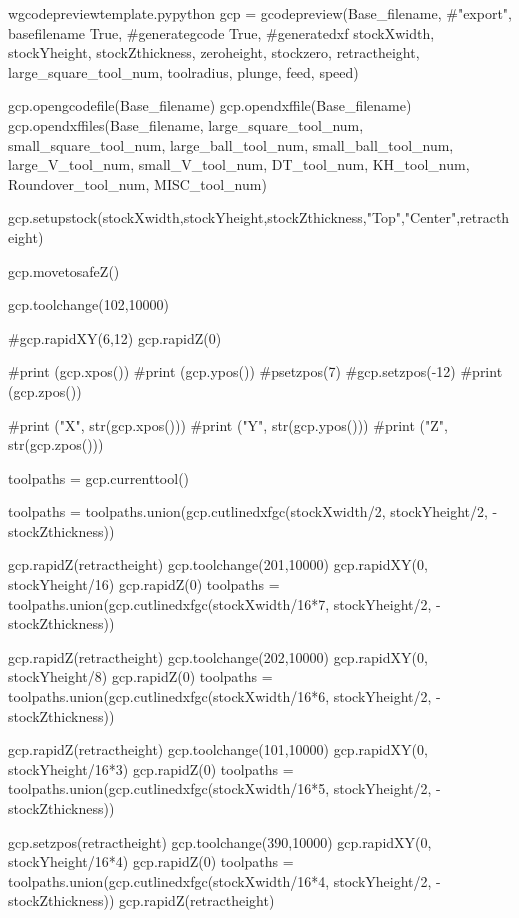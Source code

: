 \documentclass{ltxdoc}
\begin{document}
\begin{writecode}{w}{gcodepreviewtemplate.py}{python}
gcp = gcodepreview(Base_filename, #"export", basefilename
                   True, #generategcode
                   True, #generatedxf
                   stockXwidth,
                   stockYheight,
                   stockZthickness,
                   zeroheight,
                   stockzero,
                   retractheight,
                   large_square_tool_num,
                   toolradius,
                   plunge,
                   feed,
                   speed)

gcp.opengcodefile(Base_filename)
gcp.opendxffile(Base_filename)
gcp.opendxffiles(Base_filename,
                 large_square_tool_num, 
                 small_square_tool_num, 
                 large_ball_tool_num,
                 small_ball_tool_num,
                 large_V_tool_num,
                 small_V_tool_num,
                 DT_tool_num,
                 KH_tool_num,
                 Roundover_tool_num,
                 MISC_tool_num)

gcp.setupstock(stockXwidth,stockYheight,stockZthickness,"Top","Center",retractheight)

gcp.movetosafeZ()

gcp.toolchange(102,10000)

#gcp.rapidXY(6,12)
gcp.rapidZ(0)

#print (gcp.xpos())
#print (gcp.ypos())
#psetzpos(7)
#gcp.setzpos(-12)
#print (gcp.zpos())

#print ("X", str(gcp.xpos()))
#print ("Y", str(gcp.ypos()))
#print ("Z", str(gcp.zpos()))

toolpaths = gcp.currenttool()

toolpaths = toolpaths.union(gcp.cutlinedxfgc(stockXwidth/2, stockYheight/2, -stockZthickness))

gcp.rapidZ(retractheight)
gcp.toolchange(201,10000)
gcp.rapidXY(0, stockYheight/16)
gcp.rapidZ(0)
toolpaths = toolpaths.union(gcp.cutlinedxfgc(stockXwidth/16*7, stockYheight/2, -stockZthickness))

gcp.rapidZ(retractheight)
gcp.toolchange(202,10000)
gcp.rapidXY(0, stockYheight/8)
gcp.rapidZ(0)
toolpaths = toolpaths.union(gcp.cutlinedxfgc(stockXwidth/16*6, stockYheight/2, -stockZthickness))

gcp.rapidZ(retractheight)
gcp.toolchange(101,10000)
gcp.rapidXY(0, stockYheight/16*3)
gcp.rapidZ(0)
toolpaths = toolpaths.union(gcp.cutlinedxfgc(stockXwidth/16*5, stockYheight/2, -stockZthickness))

gcp.setzpos(retractheight)
gcp.toolchange(390,10000)
gcp.rapidXY(0, stockYheight/16*4)
gcp.rapidZ(0)
toolpaths = toolpaths.union(gcp.cutlinedxfgc(stockXwidth/16*4, stockYheight/2, -stockZthickness))
gcp.rapidZ(retractheight)


\end{writecode}
\end{document}
